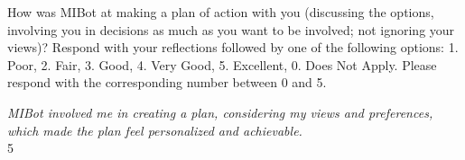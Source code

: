 \begin{researcherbox}
How was MIBot at making a plan of action with you (discussing the options, involving you in decisions as much as you want to be involved; not ignoring your views)? Respond with your reflections followed by one of the following options: 1. Poor, 2. Fair, 3. Good, 4. Very Good, 5. Excellent, 0. Does Not Apply. Please respond with the corresponding number between 0 and 5.
\end{researcherbox}

\begin{clientbox}
\textit{MIBot involved me in creating a plan, considering my views and preferences, which made the plan feel personalized and achievable.} \\
5
\end{clientbox}

